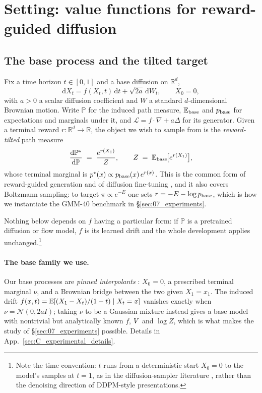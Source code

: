 \section{Setting: value functions for reward-guided diffusion}
\label{sec:02_setting}

\subsection{The base process and the tilted target}

Fix a time horizon $t\in[0,1]$ and a base diffusion on $\mathbb{R}^{d}$,
\begin{equation}
  \mathrm{d}X_t = f(X_t,t)\,\mathrm{d}t + \sqrt{2a}\,\mathrm{d}W_t,
  \qquad X_0 = 0,
  \label{eq:base-sde}
\end{equation}
with $a>0$ a scalar diffusion coefficient and $W$ a standard $d$-dimensional
Brownian motion. Write $\mathbb{P}$ for the induced path measure, $\mathbb{E}_{\mathrm{base}}$
and $p_{\mathrm{base}}$ for expectations and marginals under it, and
$\mathcal{L}=f\cdot\nabla + a\Delta$ for its generator. Given a terminal reward
$r:\mathbb{R}^{d}\to\mathbb{R}$, the object we wish to sample from is the
\emph{reward-tilted} path measure
\begin{equation}
  \frac{\mathrm{d}\mathbb{P}^{\star}}{\mathrm{d}\mathbb{P}}
  \;=\; \frac{e^{r(X_1)}}{Z},
  \qquad
  Z \;=\; \mathbb{E}_{\mathrm{base}}\!\big[e^{r(X_1)}\big],
  \label{eq:tilt}
\end{equation}
whose terminal marginal is $p^{\star}(x)\propto p_{\mathrm{base}}(x)\,e^{r(x)}$. This is
the common form of reward-guided generation and of diffusion fine-tuning
\citep{song2021sde,black2024ddpo,uehara2024finetuning}, and it also covers Boltzmann sampling: to target
$\pi\propto e^{-E}$ one sets $r = -E - \log p_{\mathrm{base}}$, which is how we
instantiate the GMM-40 benchmark in \S\ref{sec:07_experiments}.

Nothing below depends on $f$ having a particular form: if $\mathbb{P}$ is a
pretrained diffusion or flow model, $f$ is its learned drift and the whole
development applies unchanged.\footnote{Note the time convention: $t$ runs from
a deterministic start $X_0=0$ to the model's samples at $t=1$, as in the
diffusion-sampler literature \citep{zhang2021pis,vargas2023dds}, rather than
the denoising direction of DDPM-style presentations.}

\paragraph{The base family we use.}
\label{subsec:base-family}
Our base processes are \emph{pinned interpolants}
\citep{albergo2023interpolants,lipman2023flowmatching}: $X_0=0$, a prescribed
terminal marginal $\nu$, and a Brownian bridge between the two given $X_1=x_1$.
The induced drift $f(x,t)=\mathbb{E}[(X_1-X_t)/(1-t)\mid X_t=x]$ vanishes exactly when
$\nu=\mathcal{N}(0,2aI)$; taking $\nu$ to be a Gaussian mixture instead gives a
base model with nontrivial but analytically known $f$, $V$ and $\log Z$,
which is what makes the study of \S\ref{sec:07_experiments} possible. Details
in App.~\ref{sec:C_experimental_details}.

